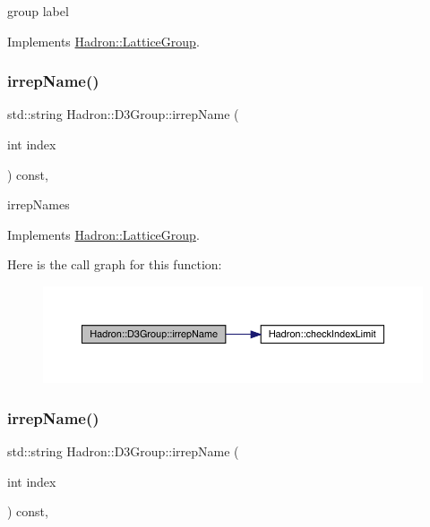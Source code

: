 group label 

Implements \mbox{\hyperlink{structHadron_1_1LatticeGroup_a82208a322bf1b1db489f16af38e70087}{Hadron\+::\+Lattice\+Group}}.

\mbox{\label{structHadron_1_1D3Group_a3e60ca3001ddc0176179107cfed2d621}} 
\subsubsection{\texorpdfstring{irrepName()}{irrepName()}\hspace{0.1cm}{\footnotesize\ttfamily [1/2]}}
{\footnotesize\ttfamily std\+::string Hadron\+::\+D3\+Group\+::irrep\+Name (\begin{DoxyParamCaption}\item[{int}]{index }\end{DoxyParamCaption}) const\hspace{0.3cm}{\ttfamily [inline]}, {\ttfamily [virtual]}}

irrep\+Names 

Implements \mbox{\hyperlink{structHadron_1_1LatticeGroup_a4bc5620218c2a73157e19bc4451fe746}{Hadron\+::\+Lattice\+Group}}.

Here is the call graph for this function\+:
\nopagebreak
\begin{figure}[H]
\begin{center}
\leavevmode
\includegraphics[width=350pt]{de/de1/structHadron_1_1D3Group_a3e60ca3001ddc0176179107cfed2d621_cgraph}
\end{center}
\end{figure}
\mbox{\label{structHadron_1_1D3Group_a3e60ca3001ddc0176179107cfed2d621}} 
\subsubsection{\texorpdfstring{irrepName()}{irrepName()}\hspace{0.1cm}{\footnotesize\ttfamily [2/2]}}
{\footnotesize\ttfamily std\+::string Hadron\+::\+D3\+Group\+::irrep\+Name (\begin{DoxyParamCaption}\item[{int}]{index }\end{DoxyParamCaption}) const\hspace{0.3cm}{\ttfamily [inline]}, {\ttfamily [virtual]}}

